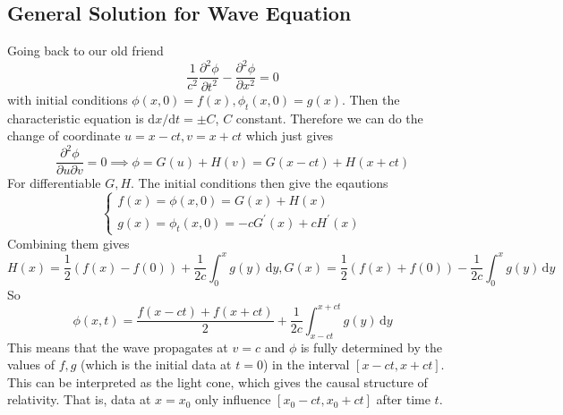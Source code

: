 \subsection{General Solution for Wave Equation}
Going back to our old friend
$$\frac{1}{c^2}\frac{\partial^2\phi}{\partial t^2}-\frac{\partial^2\phi}{\partial x^2}=0$$
with initial conditions $\phi(x,0)=f(x),\phi_t(x,0)=g(x)$.
Then the characteristic equation is $\mathrm dx/\mathrm dt=\pm C$, $C$ constant.
Therefore we can do the change of coordinate $u=x-ct,v=x+ct$ which just gives
$$\frac{\partial^2\phi}{\partial u\partial v}=0\implies \phi=G(u)+H(v)=G(x-ct)+H(x+ct)$$
For differentiable $G,H$.
The initial conditions then give the eqautions
$$\begin{cases}
    f(x)=\phi(x,0)=G(x)+H(x)\\
    g(x)=\phi_t(x,0)=-cG^\prime(x)+cH^\prime(x)
\end{cases}$$
Combining them gives
$$H(x)=\frac{1}{2}(f(x)-f(0))+\frac{1}{2c}\int_0^xg(y)\,\mathrm dy,G(x)=\frac{1}{2}(f(x)+f(0))-\frac{1}{2c}\int_0^xg(y)\,\mathrm dy$$
So
$$\phi(x,t)=\frac{f(x-ct)+f(x+ct)}{2}+\frac{1}{2c}\int_{x-ct}^{x+ct}g(y)\,\mathrm dy$$
This means that the wave propagates at $v=c$ and $\phi$ is fully determined by the values of $f,g$ (which is the initial data at $t=0$) in the interval $[x-ct,x+ct]$.
This can be interpreted as the light cone, which gives the causal structure of relativity.
That is, data at $x=x_0$ only influence $[x_0-ct,x_0+ct]$ after time $t$.
